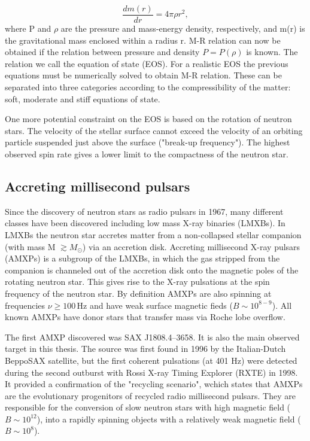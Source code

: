 \documentclass{wihuri}
\begin{document}
\begin{equation}
 \frac{dm(r)}{dr} = 4 \pi \rho r^{2},
 \end{equation}
where P and $\rho$ are the pressure and mass-energy density, respectively, and m(r) is the gravitational mass enclosed within a radius r. M-R relation can now be obtained if the relation between pressure and density $P=P(\rho)$ is known. The relation we call the equation of state (EOS). For a realistic EOS the previous equations must be numerically solved to obtain M-R relation. These can be separated into three categories according to the compressibility of the matter: soft, moderate and stiff equations of state.




One more potential constraint on the EOS is based on the rotation of neutron stars. The velocity of the stellar surface cannot exceed the velocity of an orbiting particle suspended just above the surface ("break-up frequency"). The highest observed spin rate gives a lower limit to the compactness of the neutron star.


\subsection{Accreting millisecond pulsars}




Since the discovery of neutron stars as radio pulsars
in 1967, many different classes have been discovered including low mass X-ray binaries (LMXBs). In LMXBs the neutron star accretes matter from a non-collapsed stellar companion (with mass M $\gtrsim  M_{\odot}$) via an accretion disk. Accreting millisecond X-ray pulsars (AMXPs) is a subgroup of the LMXBs, in which the gas stripped from the companion is channeled out of the accretion disk onto the magnetic poles of the rotating neutron star. This gives rise to the X-ray pulsations at the spin frequency of the neutron star. By definition AMXPs are also spinning at frequencies $\nu \ge 100 \, \mathrm{Hz}$ and have weak surface magnetic fieds ($B \sim 10^{8-9}$). All known AMXPs have donor stars that transfer mass via Roche lobe overflow. 



The first AMXP discovered was SAX J1808.4–3658. It is also the main observed target in this thesis. The source was first found in 1996 by the Italian-Dutch BeppoSAX satellite, but the first coherent pulsations (at 401 Hz) were detected during the second outburst with Rossi X-ray Timing Explorer (RXTE) in 1998.  It provided a confirmation of the "recycling scenario", wchich states that AMXPs are the evolutionary progenitors of recycled radio millisecond pulsars. They are responsible for the conversion of slow neutron stars with high magnetic field ($B \sim 10^{12}$), into a rapidly spinning objects with a relatively weak magnetic field ($B \sim 10^{8}$). 
\end{document}
